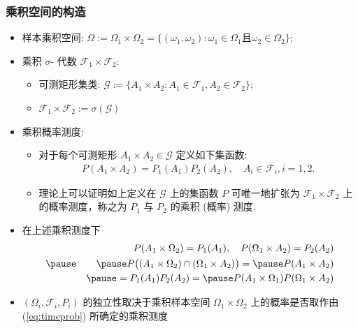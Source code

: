              \begin{frame}
               \frametitle{乘积空间的构造}
               \begin{itemize}[<+-|alert@+>]
               \item 样本乘积空间: $\Omega:=\Omega_1\times \Omega_2=\{(\omega_1,\omega_2):\omega_1\in\Omega_1\mbox{且}\omega_2\in \Omega_2\}$;
               \item 乘积 $\sigma$- 代数 $\mathcal{F}_1\times\mathcal{F}_2$:
                 \begin{itemize}[<+-|alert@+>]
                 \item 可测矩形集类: $\mathcal{G}:=\{A_1\times A_2: A_1\in\mathcal{F}_1, A_2\in \mathcal{F}_2\}$;
                 \item $\mathcal{F}_1\times \mathcal{F}_2:=\sigma(\mathcal{G})$
                 \end{itemize}
               \item 乘积概率测度:
                 \begin{itemize}[<+-|alert@+>]
                 \item 对于每个可测矩形 $A_1\times A_2\in \mathcal{G}$ 定义如下集函数:
                   \begin{eqnarray}\label{eq:timeprob}
                     P(A_1\times A_2)=P_1(A_1)P_2(A_2), \quad A_i\in\mathcal{F}_i, i=1,2.
                   \end{eqnarray}
                 \item 理论上可以证明如上定义在 $\mathcal{G}$ 上的集函数 $P$ 可唯一地扩张为 $\mathcal{F}_1\times\mathcal{F}_2$ 上的概率测度，称之为 $P_1$ 与 $P_2$ 的乘积 (概率) 测度.
                 \end{itemize}
               \item 在上述乘积测度下
                 \begin{eqnarray*}
                   &&P(A_1\times \Omega_2)=P_1(A_1), \quad P(\Omega_1\times A_2)=P_2(A_2)\\\pause
                   &&\pause P\big((A_1\times \Omega_2)\cap (\Omega_1\times A_2)\big)=\pause P(A_1\times A_2)\\
                   &&\pause = P_1(A_1)P_2(A_2)=\pause P(A_1\times\Omega_1)P(\Omega_1\times A_2)
                 \end{eqnarray*}
               \item $(\Omega_i,\mathcal{F}_i,P_i)$ 的独立性取决于乘积样本空间 $\Omega_1\times\Omega_2$ 上的概率是否取作由 (\ref{eq:timeprob}) 所确定的乘积测度
               \end{itemize}
             \end{frame}

